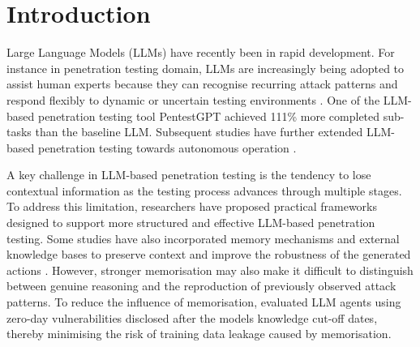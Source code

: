 \documentclass[acmtog]{acmart}
\begin{document}


\maketitle

\section{Introduction}

Large Language Models (LLMs) have recently been in rapid development. For instance in penetration testing domain, LLMs are increasingly being adopted to assist human experts because they can recognise recurring attack patterns and respond flexibly to dynamic or uncertain testing environments \cite{happe_surprising_2025}. One of the LLM-based penetration testing tool PentestGPT \cite{deng_pentestgpt_2024} achieved 111\% more completed sub-tasks than the baseline LLM. Subsequent studies have further extended LLM-based penetration testing towards autonomous operation \cite{kong_vulnbot_2025,gioacchini_autopenbench_2024,huang_penheal_2023,dai_refpentester_2025,xu_autoattacker_2024}.

A key challenge in LLM-based penetration testing is the tendency to lose contextual information as the testing process advances through multiple stages. To address this limitation, researchers have proposed practical frameworks designed to support more structured and effective LLM-based penetration testing. Some studies have also incorporated memory mechanisms and external knowledge bases to preserve context and improve the robustness of the generated actions \cite{challita_redteamllm_2025}. However, stronger memorisation may also make it difficult to distinguish between genuine reasoning and the reproduction of previously observed attack patterns. To reduce the influence of memorisation, \citet{zhu_teams_2025} evaluated LLM agents using zero-day vulnerabilities disclosed after the models knowledge cut-off dates, thereby minimising the risk of training data leakage caused by memorisation.
\end{document}
